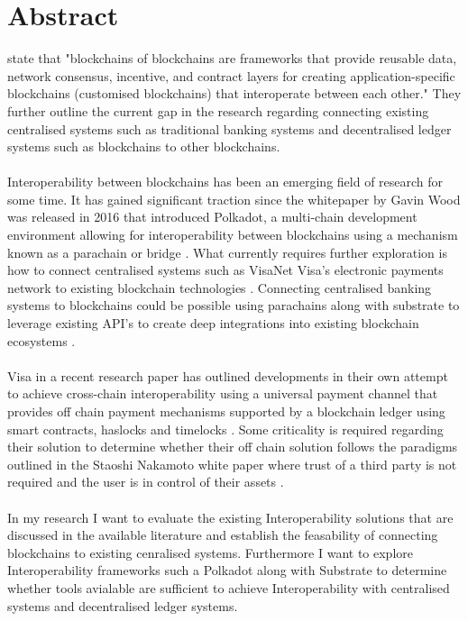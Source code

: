 \documentclass[12pt]{article}
\begin{document}
\section{Abstract}
\autocite{belchiorSurveyBlockchainInteroperability2021}
state that "blockchains of blockchains are frameworks that provide reusable data, network consensus, incentive,
and contract layers for creating application-specific blockchains (customised blockchains) that interoperate between each other."
They further outline the current gap in the research regarding connecting existing centralised systems such as traditional banking
systems and decentralised ledger systems such as blockchains to other blockchains.
\\\\
Interoperability between blockchains has been an emerging field of
research for some time. It has gained significant traction since the whitepaper by Gavin Wood was released in 2016 that introduced Polkadot,
a multi-chain development environment allowing for interoperability between blockchains using a mechanism known as a parachain or bridge \autocite{woodPOLKADOTVISIONHETEROGENEOUS2016}.
What currently requires further exploration is how to connect centralised systems such as VisaNet Visa's electronic payments network to existing blockchain technologies \autocite{VisaNetTechnologyVisa}.
Connecting centralised banking systems to blockchains could be possible using parachains along with substrate to leverage existing API's to create deep integrations into existing blockchain ecosystems \autocite{polkadotPolkadotDecoded20202021}.
\\\\
Visa in a recent research paper has outlined developments in their own attempt to achieve cross-chain interoperability using a universal payment channel that provides off chain payment mechanisms
supported by a blockchain ledger using smart contracts, haslocks and timelocks \autocite{christodorescuUniversalPaymentChannels2021}. Some criticality is required regarding their solution to determine whether their off chain solution follows the paradigms
outlined in the Staoshi Nakamoto white paper where trust of a third party is not required and the user is in control of their assets \autocite{nakamotoBitcoinPeertoPeerElectronic}.
\\\\
In my research I want to evaluate the existing Interoperability solutions that are discussed in the available literature and establish the feasability of connecting blockchains to existing cenralised systems.
Furthermore I want to explore Interoperability frameworks such a Polkadot along with Substrate to determine whether tools avialable are sufficient to achieve Interoperability with centralised systems and decentralised ledger systems.
\end{document}
